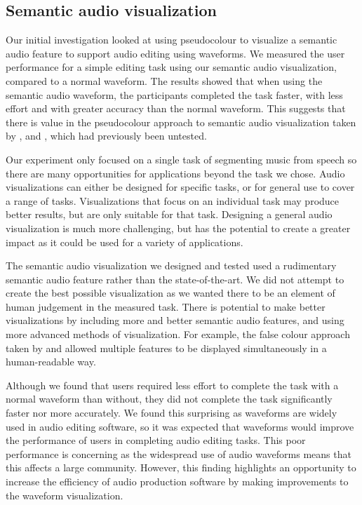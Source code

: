 \subsection{Semantic audio visualization}

Our initial investigation looked at using pseudocolour to visualize a semantic audio feature to support audio editing
using waveforms.  We measured the user performance for a simple editing task using our semantic audio visualization,
compared to a normal waveform.  The results showed that when using the semantic audio waveform, the participants
completed the task faster, with less effort and with greater accuracy than the normal waveform. This suggests that
there is value in the pseudocolour approach to semantic audio visualization taken by \citet{Rice2005},
\citet{Akkermans2011} and \citet{Loviscach2011a}, which had previously been untested.

Our experiment only focused on a single task of segmenting music from speech so there are many opportunities for
applications beyond the task we chose. Audio visualizations can either be designed for specific tasks, or for
general use to cover a range of tasks. Visualizations that focus on an individual task may produce better results, but
are only suitable for that task.  Designing a general audio visualization is much more challenging, but has the
potential to create a greater impact as it could be used for a variety of applications.

The semantic audio visualization we designed and tested used a rudimentary semantic audio feature rather than the
state-of-the-art.  We did not attempt to create the best possible visualization as we wanted there to be an element of
human judgement in the measured task. There is potential to make better visualizations by including more and
better semantic audio features, and using more advanced methods of visualization. For example, the false colour
approach taken by \citet{Tzanetakis2000} and \citet{Mason2007} allowed multiple features to be displayed simultaneously
in a human-readable way.

Although we found that users required less effort to complete the task with a normal waveform than without, they did
not complete the task significantly faster nor more accurately. We found this surprising as waveforms are widely used
in audio editing software, so it was expected that waveforms would improve the performance of users in completing audio
editing tasks.  This poor performance is concerning as the widespread use of audio waveforms means that this affects a
large community.  However, this finding highlights an opportunity to increase the efficiency of audio production
software by making improvements to the waveform visualization.

